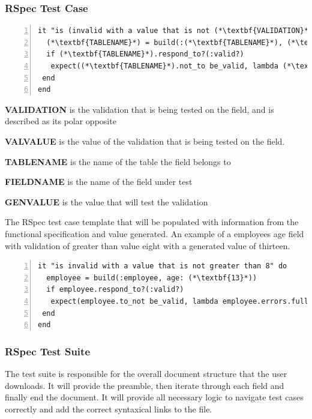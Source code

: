 \documentclass[a4paper,12pt]{article}
\begin{document}
\subsubsection{RSpec Test Case}
\begin{lstlisting}[frame=single,numbers=left,caption= {Pseudo code for value generation} label={psuedo:case}]
it "is (invalid with a value that is not (*\textbf{VALIDATION}*) (*\textbf{VALVALUE}*)" do
  (*\textbf{TABLENAME}*) = build(:(*\textbf{TABLENAME}*), (*\textbf{FIELDNAME}*): (*\textbf{GENVALUE}*)
  if (*\textbf{TABLENAME}*).respond_to?(:valid?)
   expect((*\textbf{TABLENAME}*).not_to be_valid, lambda (*\textbf{TABLENAME}*).errors.full_messages.join("\\n")
 end
end
\end{lstlisting}

\par \textbf{VALIDATION} is the validation that is being tested on the field, and is described as its polar opposite
\par \textbf{VALVALUE} is the value of the validation that is being tested on the field.
\par \textbf{TABLENAME} is the name of the table the field belongs to
\par \textbf{FIELDNAME} is the name of the field under test
\par \textbf{GENVALUE} is the value that will test the validation
\par The RSpec test case template that will be populated with information from the functional specification and value generated. An example of a employees age field with validation of greater than value eight with a generated value of thirteen.

\begin{lstlisting}[frame=single,numbers=left,caption= {Pseudo code for value generation output} label={psuedo:caseex}]
it "is invalid with a value that is not greater than 8" do
  employee = build(:employee, age: (*\textbf{13}*))
  if employee.respond_to?(:valid?)
   expect(employee.to_not be_valid, lambda employee.errors.full_messages.join("\\n")
 end
end
\end{lstlisting}

\subsubsection{RSpec Test Suite}

\par The test suite is responsible for the overall document structure that the user downloads. It will provide the preamble, then iterate through each field and finally end the document. It will provide all necessary logic to navigate test cases correctly and add the correct syntaxical links to the file. 
\end{document}
